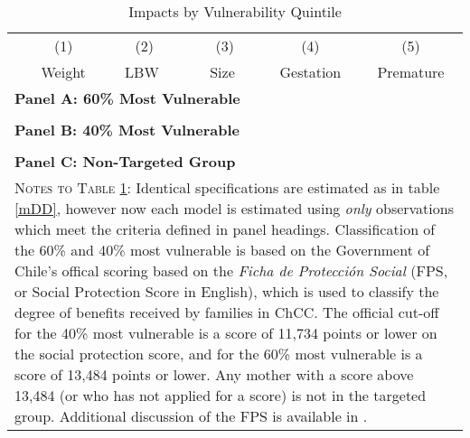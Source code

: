 \documentclass[12pt]{article}
\begin{document}
\begin{spacing}{1.4}
\begin{table}[htpb!]
  \begin{center}
    \caption{Impacts by Vulnerability Quintile}
    \label{tab:FPS}
    \begin{tabular}{lccccc} \toprule
      &(1)&(2)&(3)&(4)&(5)\\
      & Weight &\ \ LBW \ \ &\ \  Size \  \ & Gestation & Premature \\ \midrule
      \multicolumn{6}{l}{\textbf{Panel A: 60\% Most Vulnerable}} \\
      
      \\
      \multicolumn{6}{l}{\textbf{Panel B: 40\% Most Vulnerable}} \\
      
      \\
      \multicolumn{6}{l}{\textbf{Panel C: Non-Targeted Group}} \\
      
      \bottomrule
      \multicolumn{6}{p{14.7cm}}{{\footnotesize \textsc{Notes to Table \ref{tab:FPS}}:
          Identical specifications are estimated as in table \ref{mDD}, however now each
          model is estimated using \emph{only} observations which meet the criteria
          defined in panel headings. Classification of the 60\% and 40\% most vulnerable
          is based on the Government of Chile's offical scoring based on the
          \emph{Ficha de Protecci\'on Social} (FPS, or Social Protection Score in English),
          which is used to classify the degree of benefits received by families in ChCC.
          The official cut-off for the 40\% most vulnerable is a score of 11,734 points or
          lower on the social protection score, and for the 60\% most vulnerable is a score
          of 13,484 points or lower.  Any mother with a score above 13,484 (or who has not
          applied for a score) is not in the targeted group. Additional discussion of the
          FPS is available in \citet{Herreraetal2010}.}} \\
    \end{tabular}
  \end{center}
\end{table}


\end{spacing}
\end{document}
